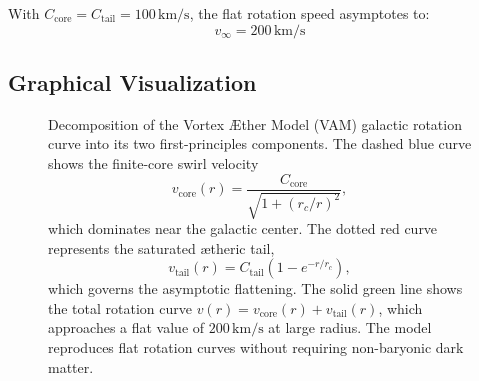 \documentclass[12pt]{article}
\begin{document}
With \( C_{\text{core}} = C_{\text{tail}} = 100\,\text{km/s} \), the flat rotation speed asymptotes to:
\[
v_\infty = 200\,\text{km/s}
\]

\subsection{Graphical Visualization}

\begin{figure}[H]
\centering
{}
\caption{
    Decomposition of the Vortex \AE{}ther Model (VAM) galactic rotation curve into its two first-principles components. The dashed blue curve shows the finite-core swirl velocity
    \[
        v_{\text{core}}(r) = \frac{C_{\text{core}}}{\sqrt{1 + (r_c/r)^2}},
    \]
    which dominates near the galactic center. The dotted red curve represents the saturated ætheric tail,
    \[
        v_{\text{tail}}(r) = C_{\text{tail}} (1 - e^{-r/r_c}),
    \]
    which governs the asymptotic flattening. The solid green line shows the total rotation curve \( v(r) = v_{\text{core}}(r) + v_{\text{tail}}(r) \), which approaches a flat value of \( 200\,\mathrm{km/s} \) at large radius. The model reproduces flat rotation curves without requiring non-baryonic dark matter.
}
\label{fig:vam_rotation_profile}
\end{figure}
\end{document}
